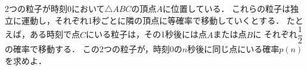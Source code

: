 \documentclass[../../main.tex]{subfiles}
\begin{document}
2つの粒子が時刻0において$\triangle ABC$の頂点$A$に位置している．
これらの粒子は独立に運動し，それぞれ1秒ごとに隣の頂点に等確率で移動していくとする．
たとえば，ある時刻で点$C$にいる粒子は，その1秒後には点$A$または点$B$に
それぞれ$\displaystyle\dfrac{1}{2}$の確率で移動する．
この2つの粒子が，時刻0の$n$秒後に同じ点にいる確率$p(n)$を求めよ．
\end{document}
